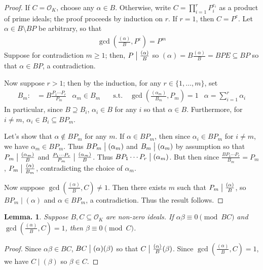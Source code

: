 \documentclass[11pt, a4paper]{memoir}
\renewcommand{\div}{\bigm|}
\theoremstyle{change}
\newtheorem{lemma}[theorem]{Lemma.}
\theoremstyle{plain}
\theoremstyle{nonumberplain}
\newtheorem{proof}{Proof}
\numberwithin{equation}{section}
\begin{document}
\begin{proof}
    If $C=\mathcal{O}_K$, choose any $\alpha\in B$.
    Otherwise, write $C=\prod_{i=1}^r P_i^{e_i}$ as a product of prime ideals; the proof proceeds by induction on $r$.
    If $r=1$, then $C=P^e$.
    Let $\alpha\in B\setminus BP$ be arbitrary, so that
    \begin{align*}
        \gcd\left(\frac{(\alpha)}{B},P^e\right)=P^m
    \end{align*}
    Suppose for contradiction $m\geq 1$; then, $P\div\frac{(\alpha)}{B}$ so $(\alpha)=B\frac{(\alpha)}{B}=BP E\subseteq BP$ so that $\alpha\in BP$, a contradiction.

    Now suppose $r>1$; then by the induction, for any $r\in\{1,\ldots,m\}$, set
    \begin{align*}
        B_m:&=B\frac{P_1\cdots P_r}{P_m} & \alpha_m \in B_m &\quad\text{s.t.}\quad\gcd\left(\frac{(\alpha_m)}{B_m},P_m\right)=1 & \alpha=\sum_{i=1}^r\alpha_i
    \end{align*}
    In particular, since $B\supseteq B_i$, $\alpha_i\in B$ for any $i$ so that $\alpha\in B$.
    Furthermore, for $i\neq m$, $\alpha_i\in B_i\subseteq BP_m$.

    Let's show that $\alpha\notin BP_m$ for any $m$.
    If $\alpha\in BP_m$, then since $\alpha_i\in BP_m$ for $i\neq m$, we have $\alpha_m\in BP_m$.
    Thus $BP_m\div(\alpha_m)$ and $B_m\div(\alpha_m)$ by assumption so that $P_m\div\frac{(\alpha_m)}{B}$ and $\frac{P_1\cdots P_r}{P_m}\div\frac{(\alpha_m)}{B}$.
    Thus $BP_1\cdots P_r\div(\alpha_m)$.
    But then since $\frac{BP_1\cdots P_r}{B_m}=P_m$, $P_m\div\frac{(\alpha)}{B_m}$, contradicting the choice of $\alpha_m$.

    Now suppose $\gcd\left(\frac{(\alpha)}{B},C\right)\neq 1$.
    Then there exists $m$ such that $P_m\div\frac{(\alpha)}{B}$, so $BP_m\mid(\alpha)$ and $\alpha\in BP_m$, a contradiction.
    Thus the result follows.
\end{proof}
\begin{lemma}\label{lem:gcd-cp}
    Suppose $B,C\subseteq\mathcal{O}_K$ are non-zero ideals.
    If $\alpha\beta\equiv 0\pmod{BC}$ and $\gcd\left(\frac{(\alpha)}{B},C\right)=1$, then $\beta\equiv 0\pmod{C}$.
\end{lemma}
\begin{proof}
    Since $\alpha\beta\in BC$, $BC\div(\alpha)(\beta)$ so that $C\div\frac{(\alpha)}{B}(\beta)$.
    Since $\gcd\left(\frac{(\alpha)}{B},C\right)=1$, we have $C\mid(\beta)$ so $\beta\in C$.
\end{proof}
\end{document}
